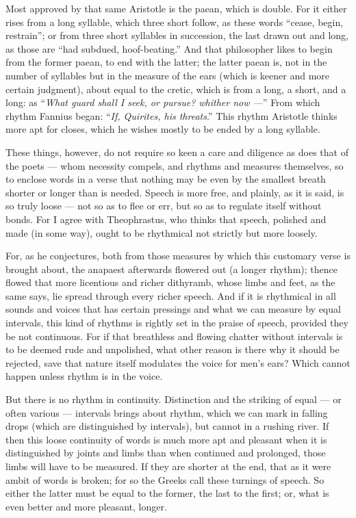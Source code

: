  Most approved by that same Aristotle is the paean, which is double. For it either rises from a long syllable, which three short follow, as these words ``cease, begin, restrain''; or from three short syllables in succession, the last drawn out and long, as those are ``had subdued, hoof-beating.'' And that philosopher likes to begin from the former paean, to end with the latter; the latter paean is, not in the number of syllables but in the measure of the ears (which is keener and more certain judgment), about equal to the cretic, which is from a long, a short, and a long: as ``\textit{What guard shall I seek, or pursue? whither now —}'' From which rhythm Fannius began: ``\textit{If, Quirites, his threats}.'' This rhythm Aristotle thinks more apt for closes, which he wishes mostly to be ended by a long syllable.

 These things, however, do not require so keen a care and diligence as does that of the poets — whom necessity compels, and rhythms and measures themselves, so to enclose words in a verse that nothing may be even by the smallest breath shorter or longer than is needed. Speech is more free, and plainly, as it is said, is so truly loose — not so as to flee or err, but so as to regulate itself without bonds. For I agree with Theophrastus, who thinks that speech, polished and made (in some way), ought to be rhythmical not strictly but more loosely.

 For, as he conjectures, both from those measures by which this customary verse is brought about, the anapaest afterwards flowered out (a longer rhythm); thence flowed that more licentious and richer dithyramb, whose limbs and feet, as the same says, lie spread through every richer speech. And if it is rhythmical in all sounds and voices that has certain pressings and what we can measure by equal intervals, this kind of rhythms is rightly set in the praise of speech, provided they be not continuous. For if that breathless and flowing chatter without intervals is to be deemed rude and unpolished, what other reason is there why it should be rejected, save that nature itself modulates the voice for men's ears? Which cannot happen unless rhythm is in the voice.

 But there is no rhythm in continuity. Distinction and the striking of equal — or often various — intervals brings about rhythm, which we can mark in falling drops (which are distinguished by intervals), but cannot in a rushing river. If then this loose continuity of words is much more apt and pleasant when it is distinguished by joints and limbs than when continued and prolonged, those limbs will have to be measured. If they are shorter at the end, that as it were ambit of words is broken; for so the Greeks call these turnings of speech. So either the latter must be equal to the former, the last to the first; or, what is even better and more pleasant, longer.

